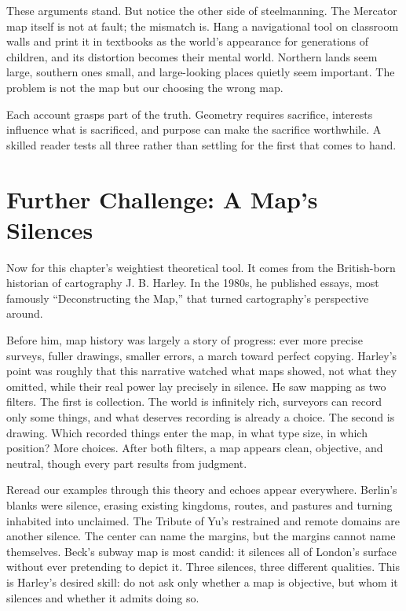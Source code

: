 These arguments stand. But notice the other side of steelmanning. The Mercator map itself is not at fault; the mismatch is. Hang a navigational tool on classroom walls and print it in textbooks as the world's appearance for generations of children, and its distortion becomes their mental world. Northern lands seem large, southern ones small, and large-looking places quietly seem important. The problem is not the map but our choosing the wrong map.

Each account grasps part of the truth. Geometry requires sacrifice, interests influence what is sacrificed, and purpose can make the sacrifice worthwhile. A skilled reader tests all three rather than settling for the first that comes to hand.

\section{Further Challenge: A Map's Silences}
Now for this chapter's weightiest theoretical tool. It comes from the British-born historian of cartography J. B. Harley. In the 1980s, he published essays, most famously ``Deconstructing the Map,'' that turned cartography's perspective around.

Before him, map history was largely a story of progress: ever more precise surveys, fuller drawings, smaller errors, a march toward perfect copying. Harley's point was roughly that this narrative watched what maps showed, not what they omitted, while their real power lay precisely in silence. He saw mapping as two filters. The first is collection. The world is infinitely rich, surveyors can record only some things, and what deserves recording is already a choice. The second is drawing. Which recorded things enter the map, in what type size, in which position? More choices. After both filters, a map appears clean, objective, and neutral, though every part results from judgment.

Reread our examples through this theory and echoes appear everywhere. Berlin's blanks were silence, erasing existing kingdoms, routes, and pastures and turning inhabited into unclaimed. The Tribute of Yu's restrained and remote domains are another silence. The center can name the margins, but the margins cannot name themselves. Beck's subway map is most candid: it silences all of London's surface without ever pretending to depict it. Three silences, three different qualities. This is Harley's desired skill: do not ask only whether a map is objective, but whom it silences and whether it admits doing so.


